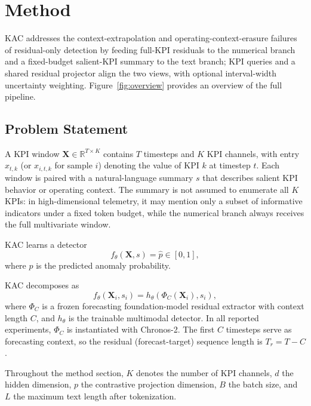 \documentclass[conference]{IEEEtran}
\begin{document}
\section{Method}
\label{sec:method}

KAC addresses the context-extrapolation and operating-context-erasure failures of residual-only detection by feeding full-KPI residuals to the numerical branch and a fixed-budget salient-KPI summary to the text branch; KPI queries and a shared residual projector align the two views, with optional interval-width uncertainty weighting. Figure~\ref{fig:overview} provides an overview of the full pipeline.

\subsection{Problem Statement}
\label{sec:problem}

A KPI window $\mathbf{X} \in \mathbb{R}^{T \times K}$ contains $T$ timesteps and $K$ KPI channels, with entry $x_{t,k}$ (or $x_{i,t,k}$ for sample $i$) denoting the value of KPI $k$ at timestep $t$. Each window is paired with a natural-language summary $s$ that describes salient KPI behavior or operating context. The summary is not assumed to enumerate all $K$ KPIs: in high-dimensional telemetry, it may mention only a subset of informative indicators under a fixed token budget, while the numerical branch always receives the full multivariate window.

KAC learns a detector
\begin{equation}
    f_\theta(\mathbf{X}, s)=\hat{p}\in[0,1],
\end{equation}
where $\hat{p}$ is the predicted anomaly probability.

KAC decomposes as
\begin{equation}
    f_\theta(\mathbf{X}_i,s_i)
    =
    h_\theta\!\left(\Phi_C(\mathbf{X}_i), s_i\right),
\end{equation}
where $\Phi_C$ is a frozen forecasting foundation-model residual extractor with context length $C$, and $h_\theta$ is the trainable multimodal detector. In all reported experiments, $\Phi_C$ is instantiated with Chronos-2. The first $C$ timesteps serve as forecasting context, so the residual (forecast-target) sequence length is $T_r=T-C$.

Throughout the method section, $K$ denotes the number of KPI channels, $d$ the hidden dimension, $p$ the contrastive projection dimension, $B$ the batch size, and $L$ the maximum text length after tokenization.
\end{document}
